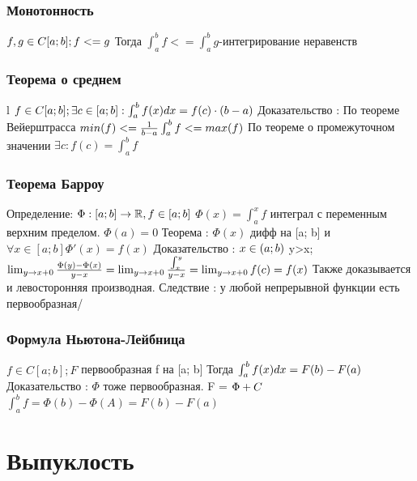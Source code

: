 \documentclass[12pt, a4paper]{article}
\newcommand{\nl}{\newline}
\newcommand{\intba}{\int^b_a}
\begin{document}
        \subsubsection{Монотонность} 
        $f, g \in C[a; b]; f<=g \nl$
        Тогда $\int^b_a f <= \int^b_a g$-интегрирование неравенств \nl
        \subsubsection{Теорема о среднем}l
        $f \in C[a;b]; \exists c \in [a;b] : \int^b_a f(x)dx = f(c) \cdot (b-a) \nl$
        Доказательство : \nl
        По теореме Вейерштрасса $min(f) <= \frac{1}{b-a}\intba f <=max(f) \nl$
        По теореме о промежуточном значении $\exists c : f(c) = \intba f$
        
        \subsubsection{Теорема Барроу}
        Определение: \nl
        $\Phi : [a;b] \rightarrow \mathbb{R}, f \in [a;b] \nl$
        $\Phi(x) = \int_a^x f$ интеграл с переменным верхним пределом. \nl
        $\Phi(a) = 0$
        Теорема : 
        $\Phi(x)$ дифф на [a; b] и $\forall x \in [a; b] \Phi'(x) = f(x)$ \nl
        Доказательство : \nl
        $x \in (a; b) \nl$
        y>x; $\lim_{y \to x+0} \frac{\Phi(y)-\Phi(x)}{y-x} = \lim_{y \to x+0}\frac{\int^y_x}{y-x} = \lim_{y \to x+0} f(c) = f(x) \nl $
        Также доказывается и левосторонняя производная. \nl
        Следствие : у любой непрерывной функции есть первообразная/
        
        \subsubsection{Формула Ньютона-Лейбница}
        $f \in C[a; b]; F$ первообразная f на [a; b]\nl
        Тогда $\intba f(x)dx = F(b)-F(a) \nl$
        Доказательство : \nl
        $\Phi$ тоже первообразная. F = $\Phi + C\nl$
        $\intba f = \Phi(b)-\Phi(A) = F(b)-F(a)$
        
    

    

\section{Выпуклость}
\end{document}
